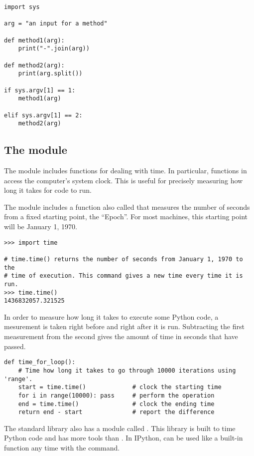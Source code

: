 \begin{lstlisting}
import sys

arg = "an input for a method"

def method1(arg):
	print("-".join(arg))

def method2(arg):
	print(arg.split())

if sys.argv[1] == 1:
	method1(arg)

elif sys.argv[1] == 2:
	method2(arg)
\end{lstlisting}

\subsection*{The  module}

The  module includes functions for dealing with time.
In particular, functions in  access the computer's system clock.
This is useful for precisely measuring how long it takes for code to run.

The  module includes a function also called  that measures the number of seconds from a fixed starting point, the ``Epoch''.
For most machines, this starting point will be January 1, 1970.

\begin{lstlisting}
>>> import time

# time.time() returns the number of seconds from January 1, 1970 to the
# time of execution. This command gives a new time every time it is run.
>>> time.time()
1436832057.321525
\end{lstlisting}

In order to measure how long it takes to execute some Python code, a mesurement is taken right before and right after it is run.
Subtracting the first measurement from the second gives the amount of time in seconds that have passed.

\begin{lstlisting}
def time_for_loop():
	# Time how long it takes to go through 10000 iterations using 'range'.
	start = time.time()				# clock the starting time
	for i in range(10000): pass		# perform the operation
	end = time.time()				# clock the ending time
	return end - start				# report the difference
\end{lstlisting}

The standard library also has a module called .
This library is built to time Python code and has more tools than 
.
In IPython,  can be used like a built-in function any time with the  command.

